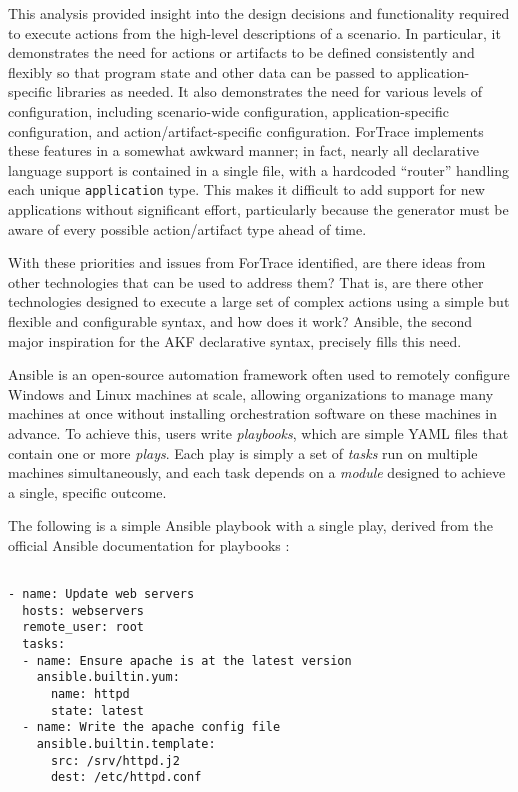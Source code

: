 \documentclass[letterpaper,12pt]{report}
\newcommand{\passthrough}[1]{#1}
\begin{document}
This analysis provided insight into the design decisions and
functionality required to execute actions from the high-level
descriptions of a scenario. In particular, it demonstrates the need for
actions or artifacts to be defined consistently and flexibly so that
program state and other data can be passed to application-specific
libraries as needed. It also demonstrates the need for various levels of
configuration, including scenario-wide configuration,
application-specific configuration, and action/artifact-specific
configuration. ForTrace implements these features in a somewhat awkward
manner; in fact, nearly all declarative language support is contained in
a single file, with a hardcoded ``router'' handling each unique
\passthrough{\lstinline!application!} type. This makes it difficult to
add support for new applications without significant effort,
particularly because the generator must be aware of every possible
action/artifact type ahead of time.

With these priorities and issues from ForTrace identified, are there
ideas from other technologies that can be used to address them? That is,
are there other technologies designed to execute a large set of complex
actions using a simple but flexible and configurable syntax, and how
does it work? Ansible, the second major inspiration for the AKF
declarative syntax, precisely fills this need.

Ansible \cite{AnsibleAnsible2025} is an open-source automation
framework often used to remotely configure Windows and Linux machines at
scale, allowing organizations to manage many machines at once without
installing orchestration software on these machines in advance. To
achieve this, users write \emph{playbooks}, which are simple YAML files
that contain one or more \emph{plays}. Each play is simply a set of
\emph{tasks} run on multiple machines simultaneously, and each task
depends on a \emph{module} designed to achieve a single, specific
outcome.

The following is a simple Ansible playbook with a single play, derived
from the official Ansible documentation for playbooks
\cite{ansibleprojectcontributorsAnsiblePlaybooks}:

\begin{lstlisting}

- name: Update web servers
  hosts: webservers
  remote_user: root
  tasks:
  - name: Ensure apache is at the latest version
    ansible.builtin.yum:
      name: httpd
      state: latest
  - name: Write the apache config file
    ansible.builtin.template:
      src: /srv/httpd.j2
      dest: /etc/httpd.conf
\end{lstlisting}
\end{document}
